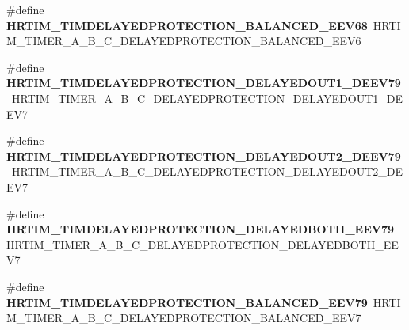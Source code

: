 \begin{DoxyCompactItemize}
\item 
\hypertarget{group___h_a_l___h_r_t_i_m___aliased___macros_gacc9d18290b90bd3ba98bc6aade450b32}{\#define {\bfseries H\-R\-T\-I\-M\-\_\-\-T\-I\-M\-D\-E\-L\-A\-Y\-E\-D\-P\-R\-O\-T\-E\-C\-T\-I\-O\-N\-\_\-\-B\-A\-L\-A\-N\-C\-E\-D\-\_\-\-E\-E\-V68}~H\-R\-T\-I\-M\-\_\-\-T\-I\-M\-E\-R\-\_\-\-A\-\_\-\-B\-\_\-\-C\-\_\-\-D\-E\-L\-A\-Y\-E\-D\-P\-R\-O\-T\-E\-C\-T\-I\-O\-N\-\_\-\-B\-A\-L\-A\-N\-C\-E\-D\-\_\-\-E\-E\-V6}\label{group___h_a_l___h_r_t_i_m___aliased___macros_gacc9d18290b90bd3ba98bc6aade450b32}

\item 
\hypertarget{group___h_a_l___h_r_t_i_m___aliased___macros_gaf2fa730ef2ff94596dc103780c6ea28a}{\#define {\bfseries H\-R\-T\-I\-M\-\_\-\-T\-I\-M\-D\-E\-L\-A\-Y\-E\-D\-P\-R\-O\-T\-E\-C\-T\-I\-O\-N\-\_\-\-D\-E\-L\-A\-Y\-E\-D\-O\-U\-T1\-\_\-\-D\-E\-E\-V79}~H\-R\-T\-I\-M\-\_\-\-T\-I\-M\-E\-R\-\_\-\-A\-\_\-\-B\-\_\-\-C\-\_\-\-D\-E\-L\-A\-Y\-E\-D\-P\-R\-O\-T\-E\-C\-T\-I\-O\-N\-\_\-\-D\-E\-L\-A\-Y\-E\-D\-O\-U\-T1\-\_\-\-D\-E\-E\-V7}\label{group___h_a_l___h_r_t_i_m___aliased___macros_gaf2fa730ef2ff94596dc103780c6ea28a}

\item 
\hypertarget{group___h_a_l___h_r_t_i_m___aliased___macros_ga8facb4c8782a5539246df190451ebf91}{\#define {\bfseries H\-R\-T\-I\-M\-\_\-\-T\-I\-M\-D\-E\-L\-A\-Y\-E\-D\-P\-R\-O\-T\-E\-C\-T\-I\-O\-N\-\_\-\-D\-E\-L\-A\-Y\-E\-D\-O\-U\-T2\-\_\-\-D\-E\-E\-V79}~H\-R\-T\-I\-M\-\_\-\-T\-I\-M\-E\-R\-\_\-\-A\-\_\-\-B\-\_\-\-C\-\_\-\-D\-E\-L\-A\-Y\-E\-D\-P\-R\-O\-T\-E\-C\-T\-I\-O\-N\-\_\-\-D\-E\-L\-A\-Y\-E\-D\-O\-U\-T2\-\_\-\-D\-E\-E\-V7}\label{group___h_a_l___h_r_t_i_m___aliased___macros_ga8facb4c8782a5539246df190451ebf91}

\item 
\hypertarget{group___h_a_l___h_r_t_i_m___aliased___macros_ga81abc6daa4a2456ca1428c3fe1796e52}{\#define {\bfseries H\-R\-T\-I\-M\-\_\-\-T\-I\-M\-D\-E\-L\-A\-Y\-E\-D\-P\-R\-O\-T\-E\-C\-T\-I\-O\-N\-\_\-\-D\-E\-L\-A\-Y\-E\-D\-B\-O\-T\-H\-\_\-\-E\-E\-V79}~H\-R\-T\-I\-M\-\_\-\-T\-I\-M\-E\-R\-\_\-\-A\-\_\-\-B\-\_\-\-C\-\_\-\-D\-E\-L\-A\-Y\-E\-D\-P\-R\-O\-T\-E\-C\-T\-I\-O\-N\-\_\-\-D\-E\-L\-A\-Y\-E\-D\-B\-O\-T\-H\-\_\-\-E\-E\-V7}\label{group___h_a_l___h_r_t_i_m___aliased___macros_ga81abc6daa4a2456ca1428c3fe1796e52}

\item 
\hypertarget{group___h_a_l___h_r_t_i_m___aliased___macros_gad90cefe9f64cf5f3efe38213706b4f94}{\#define {\bfseries H\-R\-T\-I\-M\-\_\-\-T\-I\-M\-D\-E\-L\-A\-Y\-E\-D\-P\-R\-O\-T\-E\-C\-T\-I\-O\-N\-\_\-\-B\-A\-L\-A\-N\-C\-E\-D\-\_\-\-E\-E\-V79}~H\-R\-T\-I\-M\-\_\-\-T\-I\-M\-E\-R\-\_\-\-A\-\_\-\-B\-\_\-\-C\-\_\-\-D\-E\-L\-A\-Y\-E\-D\-P\-R\-O\-T\-E\-C\-T\-I\-O\-N\-\_\-\-B\-A\-L\-A\-N\-C\-E\-D\-\_\-\-E\-E\-V7}\label{group___h_a_l___h_r_t_i_m___aliased___macros_gad90cefe9f64cf5f3efe38213706b4f94}


\end{DoxyCompactItemize}
